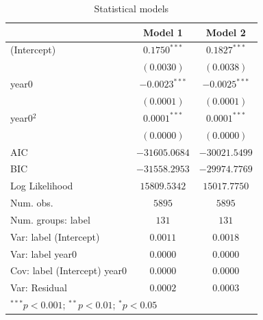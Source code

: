 
\begin{table}
\begin{center}
\begin{tabular}{l c c}
\hline
 & Model 1 & Model 2 \\
\hline
(Intercept)                  & $0.1750^{***}$  & $0.1827^{***}$  \\
                             & $(0.0030)$      & $(0.0038)$      \\
year0                        & $-0.0023^{***}$ & $-0.0025^{***}$ \\
                             & $(0.0001)$      & $(0.0001)$      \\
year0$^2$                    & $0.0001^{***}$  & $0.0001^{***}$  \\
                             & $(0.0000)$      & $(0.0000)$      \\
\hline
AIC                          & $-31605.0684$   & $-30021.5499$   \\
BIC                          & $-31558.2953$   & $-29974.7769$   \\
Log Likelihood               & $15809.5342$    & $15017.7750$    \\
Num. obs.                    & $5895$          & $5895$          \\
Num. groups: label           & $131$           & $131$           \\
Var: label (Intercept)       & $0.0011$        & $0.0018$        \\
Var: label year0             & $0.0000$        & $0.0000$        \\
Cov: label (Intercept) year0 & $0.0000$        & $0.0000$        \\
Var: Residual                & $0.0002$        & $0.0003$        \\
\hline
\multicolumn{3}{l}{\scriptsize{$^{***}p<0.001$; $^{**}p<0.01$; $^{*}p<0.05$}}
\end{tabular}
\caption{Statistical models}
\label{table:coefficients}
\end{center}
\end{table}

